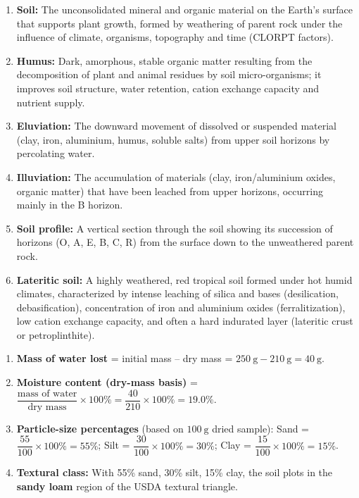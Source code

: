 \documentclass[11pt]{article}
\begin{document}
\begin{corrige}
\begin{enumerate}
\item \textbf{Soil:} The unconsolidated mineral and organic material on the Earth's surface that supports plant growth, formed by weathering of parent rock under the influence of climate, organisms, topography and time (CLORPT factors).
\item \textbf{Humus:} Dark, amorphous, stable organic matter resulting from the decomposition of plant and animal residues by soil micro-organisms; it improves soil structure, water retention, cation exchange capacity and nutrient supply.
\item \textbf{Eluviation:} The downward movement of dissolved or suspended material (clay, iron, aluminium, humus, soluble salts) from upper soil horizons by percolating water.
\item \textbf{Illuviation:} The accumulation of materials (clay, iron/aluminium oxides, organic matter) that have been leached from upper horizons, occurring mainly in the B horizon.
\item \textbf{Soil profile:} A vertical section through the soil showing its succession of horizons (O, A, E, B, C, R) from the surface down to the unweathered parent rock.
\item \textbf{Lateritic soil:} A highly weathered, red tropical soil formed under hot humid climates, characterized by intense leaching of silica and bases (desilication, debasification), concentration of iron and aluminium oxides (ferralitization), low cation exchange capacity, and often a hard indurated layer (lateritic crust or petroplinthite).
\end{enumerate}
\end{corrige}

\begin{corrige}
\begin{enumerate}
\item \textbf{Mass of water lost} = initial mass – dry mass = $250\ \mathrm{g} - 210\ \mathrm{g} = \boxed{40\ \mathrm{g}}$.
\item \textbf{Moisture content (dry-mass basis)} = $\dfrac{\text{mass of water}}{\text{dry mass}} \times 100\% = \dfrac{40}{210} \times 100\% = \boxed{19.0\%}$.
\item \textbf{Particle-size percentages} (based on $100\ \mathrm{g}$ dried sample):  
  Sand = $\dfrac{55}{100} \times 100\% = \boxed{55\%}$;  
  Silt = $\dfrac{30}{100} \times 100\% = \boxed{30\%}$;  
  Clay = $\dfrac{15}{100} \times 100\% = \boxed{15\%}$.
\item \textbf{Textural class:} With 55\% sand, 30\% silt, 15\% clay, the soil plots in the \textbf{sandy loam} region of the USDA textural triangle.
\end{enumerate}
\end{corrige}
\end{document}
